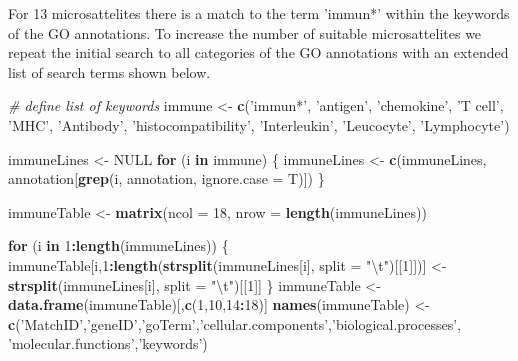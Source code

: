 \documentclass[]{article}
\newenvironment{Shaded}{\begin{snugshade}}{\end{snugshade}}
\newcommand{\KeywordTok}[1]{\textcolor[rgb]{0.13,0.29,0.53}{\textbf{#1}}}
\newcommand{\DataTypeTok}[1]{\textcolor[rgb]{0.13,0.29,0.53}{#1}}
\newcommand{\DecValTok}[1]{\textcolor[rgb]{0.00,0.00,0.81}{#1}}
\newcommand{\CharTok}[1]{\textcolor[rgb]{0.31,0.60,0.02}{#1}}
\newcommand{\StringTok}[1]{\textcolor[rgb]{0.31,0.60,0.02}{#1}}
\newcommand{\CommentTok}[1]{\textcolor[rgb]{0.56,0.35,0.01}{\textit{#1}}}
\newcommand{\OtherTok}[1]{\textcolor[rgb]{0.56,0.35,0.01}{#1}}
\newcommand{\ControlFlowTok}[1]{\textcolor[rgb]{0.13,0.29,0.53}{\textbf{#1}}}
\newcommand{\OperatorTok}[1]{\textcolor[rgb]{0.81,0.36,0.00}{\textbf{#1}}}
\newcommand{\NormalTok}[1]{#1}
\begin{document}
For 13 microsattelites there is a match to the term 'immun*' within the
keywords of the GO annotations. To increase the number of suitable
microsattelites we repeat the initial search to all categories of the GO
annotations with an extended list of search terms shown below.

\begin{Shaded}
\begin{Highlighting}[]
\CommentTok{# define list of keywords}
\NormalTok{immune <-}\StringTok{ }\KeywordTok{c}\NormalTok{(}\StringTok{'immun*'}\NormalTok{,}
            \StringTok{'antigen'}\NormalTok{,}
            \StringTok{'chemokine'}\NormalTok{,}
            \StringTok{'T cell'}\NormalTok{,}
            \StringTok{'MHC'}\NormalTok{,}
            \StringTok{'Antibody'}\NormalTok{,}
            \StringTok{'histocompatibility'}\NormalTok{,}
            \StringTok{'Interleukin'}\NormalTok{,}
            \StringTok{'Leucocyte'}\NormalTok{,}
            \StringTok{'Lymphocyte'}\NormalTok{)}

\NormalTok{immuneLines <-}\StringTok{ }\OtherTok{NULL}
\ControlFlowTok{for}\NormalTok{ (i }\ControlFlowTok{in}\NormalTok{ immune) \{ }
\NormalTok{  immuneLines <-}\StringTok{ }\KeywordTok{c}\NormalTok{(immuneLines, annotation[}\KeywordTok{grep}\NormalTok{(i, annotation, }\DataTypeTok{ignore.case =}\NormalTok{ T)])}
\NormalTok{\}}

\NormalTok{immuneTable <-}\StringTok{ }\KeywordTok{matrix}\NormalTok{(}\DataTypeTok{ncol =} \DecValTok{18}\NormalTok{, }\DataTypeTok{nrow =} \KeywordTok{length}\NormalTok{(immuneLines))}

\ControlFlowTok{for}\NormalTok{ (i }\ControlFlowTok{in} \DecValTok{1}\OperatorTok{:}\KeywordTok{length}\NormalTok{(immuneLines)) \{}
\NormalTok{immuneTable[i,}\DecValTok{1}\OperatorTok{:}\KeywordTok{length}\NormalTok{(}\KeywordTok{strsplit}\NormalTok{(immuneLines[i], }\DataTypeTok{split =} \StringTok{"}\CharTok{\textbackslash{}t}\StringTok{"}\NormalTok{)[[}\DecValTok{1}\NormalTok{]])] <-}
\StringTok{  }\KeywordTok{strsplit}\NormalTok{(immuneLines[i], }\DataTypeTok{split =} \StringTok{"}\CharTok{\textbackslash{}t}\StringTok{"}\NormalTok{)[[}\DecValTok{1}\NormalTok{]]}
\NormalTok{\}}
\NormalTok{immuneTable <-}\StringTok{ }\KeywordTok{data.frame}\NormalTok{(immuneTable)[,}\KeywordTok{c}\NormalTok{(}\DecValTok{1}\NormalTok{,}\DecValTok{10}\NormalTok{,}\DecValTok{14}\OperatorTok{:}\DecValTok{18}\NormalTok{)] }
\KeywordTok{names}\NormalTok{(immuneTable) <-}
\StringTok{  }\KeywordTok{c}\NormalTok{(}\StringTok{'MatchID'}\NormalTok{,}\StringTok{'geneID'}\NormalTok{,}\StringTok{'goTerm'}\NormalTok{,}\StringTok{'cellular.components'}\NormalTok{,}\StringTok{'biological.processes'}\NormalTok{,}
                        \StringTok{'molecular.functions'}\NormalTok{,}\StringTok{'keywords'}\NormalTok{) }


\end{Highlighting}
\end{Shaded}
\end{document}
